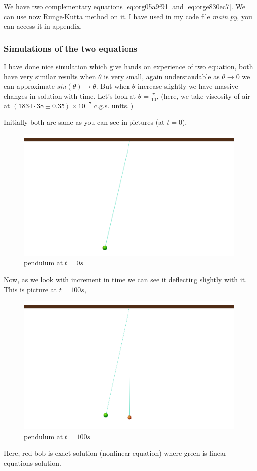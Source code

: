 \documentclass{article}
\begin{document}
We have two complementary equations \ref{eq:org05a9f91} and \ref{eq:orge830ec7}. We can use now Runge-Kutta method on it. I have used in my code file \emph{main.py}, you can access it in appendix. 

\subsubsection{Simulations of the two equations}
\label{sec:org737090b}

I have done nice simulation which give hands on experience of two equation, both have very similar results when \(\theta\) is very small, again understandable as \(\theta \to 0\) we can approximate \(sin(\theta) \to \theta\). But when \(\theta\) increase slightly we have massive changes in solution with time. Let's look at \(\theta = \frac{\pi}{10}\), (here, we take viscosity of air at \((1834·38\pm0.35)\times10^{−7}\) c.g.s. units. \cite{majumdar1938coefficient})

Initially both are same as you can see in pictures (at \(t=0\)),
\begin{figure}[htbp]
\centering
\includegraphics[width=0.8 \textwidth]{../graphs/t0.png}
\caption{\label{fig:org76323f3}pendulum at \(t=0s\)}
\end{figure}

Now, as we look with increment in time we can see it deflecting slightly with it. This is picture at \(t = 100s\),
\begin{figure}[htbp]
\centering
\includegraphics[width=0.8 \textwidth]{../graphs/t100.png}
\caption{\label{fig:org82800d4}pendulum at \(t=100s\)}
\end{figure}
Here, red bob is exact solution (nonlinear equation) where green is linear equations solution.
\end{document}
